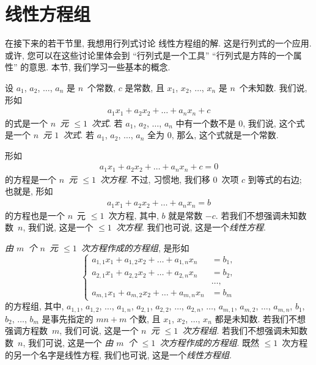 \documentclass[../libro.tex]{subfiles}
\begin{document}

\section{线性方程组}

在接下来的若干节里, 我想用行列式讨论%
线性方程组的解.
这是行列式的一个应用.
或许, 您可以在这些讨论里体会到
``行列式是一个工具''
``行列式是方阵的一个属性''
的意思.
本节, 我们学习一些基本的概念.

设 \(a_1\), \(a_2\), \(\dots\), \(a_n\) 是 \(n\)~个常数,
\(c\) 是常数,
且 \(x_1\), \(x_2\), \(\dots\), \(x_n\) 是 \(n\)~个未知数.
我们说, 形如
\begin{align*}
    a_1 x_1 + a_2 x_2 + \dots + a_n x_n + c
\end{align*}
的式是一个 \emph{\(n\)~元 \({\leq} 1\)~次式}.
若 \(a_1\), \(a_2\), \(\dots\), \(a_n\)
中有一个数不是 \(0\),
我们说, 这个式是一个 \emph{\(n\)~元 \(1\)~次式}.
若 \(a_1\), \(a_2\), \(\dots\), \(a_n\)
全为 \(0\),
那么, 这个式就是一个常数.

形如
\begin{align*}
    a_1 x_1 + a_2 x_2 + \dots + a_n x_n + c = 0
\end{align*}
的方程是一个 \emph{\(n\)~元 \({\leq} 1\)~次方程}.
不过, 习惯地, 我们移 \(0\)~次项 \(c\) 到等式的右边;
也就是, 形如
\begin{align*}
    a_1 x_1 + a_2 x_2 + \dots + a_n x_n = b
\end{align*}
的方程也是一个 \(n\)~元 \({\leq} 1\)~次方程,
其中, \(b\) 就是常数 \(-c\).
若我们不想强调未知数数~\(n\),
我们说, 这是一个 \emph{\({\leq} 1\)~次方程}.
我们也可说, 这是一个\emph{线性方程}.

\emph{由 \(m\)~个 \(n\)~元 \({\leq} 1\)~次方程作成的方程组},
是形如
\begin{equation*}
    \left\{ %
    \begin{aligned}
        a_{1,1} x_1 + a_{1,2} x_2 + \dots + a_{1,n} x_n & = b_1, \\
        a_{2,1} x_1 + a_{2,2} x_2 + \dots + a_{2,n} x_n & = b_2, \\
        & \dots, \\
        a_{m,1} x_1 + a_{m,2} x_2 + \dots + a_{m,n} x_n & = b_m
    \end{aligned}
    \right. %
\end{equation*}
的方程组,
其中,
\(a_{1,1}\), \(a_{1,2}\), \(\dots\), \(a_{1,n}\),
\(a_{2,1}\), \(a_{2,2}\), \(\dots\), \(a_{2,n}\),
\(\dots\),
\(a_{m,1}\), \(a_{m,2}\), \(\dots\), \(a_{m,n}\),
\(b_1\), \(b_2\), \(\dots\), \(b_m\)
是事先指定的 \(mn + m\) 个数,
且 \(x_1\), \(x_2\), \(\dots\), \(x_n\)
都是未知数.
若我们不想强调方程数~\(m\),
我们可说, 这是一个 \emph{\(n\)~元 \({\leq} 1\)~次方程组}.
若我们不想强调未知数数~\(n\),
我们可说, 这是一个%
\emph{由 \(m\)~个 \({\leq} 1\)~次方程作成的方程组}.
既然 \({\leq} 1\)~次方程的另一个名字是线性方程,
我们也可说, 这是一个\emph{线性方程组}.
\end{document}
